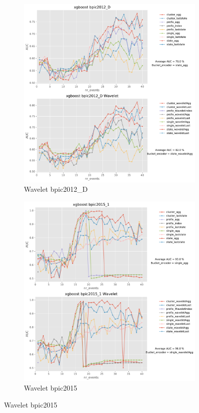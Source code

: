 \begin{figure}[!htbp] %
	
	\begin{subfigure}{0.48\textwidth}
		\includegraphics[width=\linewidth]{images/wavelet/graphs2/bpic2012_D.pdf}
		\caption{Wavelet bpic2012\_D} \label{fig:b12dw}
	\end{subfigure}\hspace*{\fill}
	\begin{subfigure}{0.48\textwidth}
		\includegraphics[width=\linewidth]{images/wavelet/graphs2/bpic2015_1.pdf}
		\caption{Wavelet bpic2015} \label{fig:b151w}
	\end{subfigure}
	

\end{figure}

